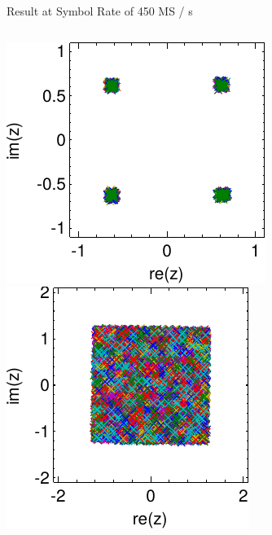 \documentclass{beamer}
\begin{document}
\begin{frame}{Result at Symbol Rate of 450 MS / s}
  \begin{columns}[T]
    \begin{column}{.4\textwidth}
      \includegraphics[width=\textwidth]{figures/matlab/res_450_qam4_cp_corr_pcorr_initial} \\
      \includegraphics[width=\textwidth]{figures/matlab/res_450_qam256_cp_corr_pcorr_initial}

\end{column}
\end{columns}
\end{frame}
\end{document}
